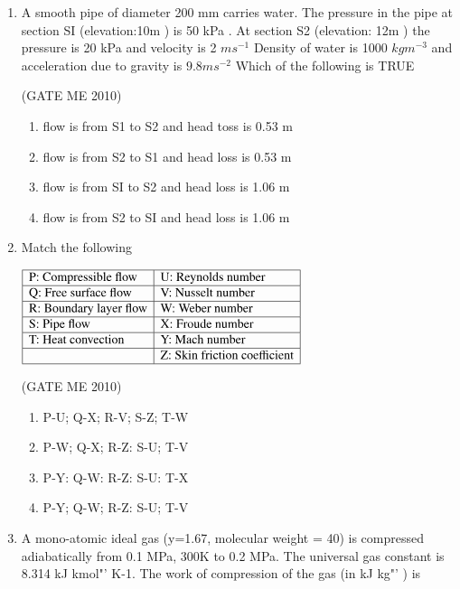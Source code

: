 \documentclass[journal,12pt,onecolumn]{IEEEtran}
\theoremstyle{remark}
\begin{document}
\begin{enumerate}
\item A smooth pipe of diameter 200 mm carries water. The pressure in the pipe at section SI (elevation:10m ) is 50 kPa . At section S2 (elevation: 12m ) the pressure is 20 kPa and velocity is 2 $ms^{-1}$
Density of water is 1000  $kgm^{-3}$ and acceleration due to gravity is $9.8 ms^{-2}$  Which of the  following is TRUE


\hfill{(GATE  ME 2010)}

\begin{enumerate}
\item  flow is from S1 to S2 and head toss is 0.53 m
\item  flow is from S2 to S1 and head loss is 0.53 m
\item  flow is from SI to S2 and head loss is 1.06 m
\item  flow is from S2 to SI and head loss is 1.06 m
\end{enumerate}


\item  Match the following 

 $
\begin{array}{|l|l|}
\hline
\text{P: Compressible flow} & \text{U: Reynolds number} \\ \hline
\text{Q: Free surface flow} & \text{V: Nusselt number} \\ \hline
\text{R: Boundary layer flow} & \text{W: Weber number} \\ \hline
\text{S: Pipe flow} & \text{X: Froude number} \\ \hline
\text{T: Heat convection} & \text{Y: Mach number} \\ \hline
& \text{Z: Skin friction coefficient} \\ \hline
\end{array}
$


\hfill{(GATE  ME 2010)}




\begin{multicols}{2}
\begin{enumerate}
\item P-U; Q-X; R-V; S-Z; T-W
\item P-W; Q-X; R-Z: S-U; T-V
\item P-Y: Q-W: R-Z: S-U: T-X
\item P-Y; Q-W; R-Z: S-U; T-V
\end{enumerate}
\end{multicols}

\item A mono-atomic ideal gas (y=1.67, molecular weight = 40) is compressed adiabatically from 0.1 MPa, 300K to 0.2 MPa. The universal gas constant is 8.314 kJ kmol"' K-1. The work of compression of the gas (in kJ kg"' ) is



\end{enumerate}
\end{document}
